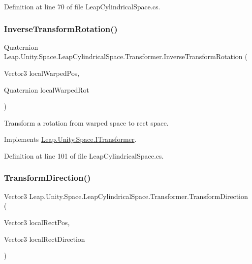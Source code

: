 Definition at line 70 of file Leap\+Cylindrical\+Space.\+cs.

\mbox{\label{class_leap_1_1_unity_1_1_space_1_1_leap_cylindrical_space_1_1_transformer_a679c3020469b4b124056bd8f83c99c26}} 
\subsubsection{\texorpdfstring{InverseTransformRotation()}{InverseTransformRotation()}}
{\footnotesize\ttfamily Quaternion Leap.\+Unity.\+Space.\+Leap\+Cylindrical\+Space.\+Transformer.\+Inverse\+Transform\+Rotation (\begin{DoxyParamCaption}\item[{Vector3}]{local\+Warped\+Pos,  }\item[{Quaternion}]{local\+Warped\+Rot }\end{DoxyParamCaption})}



Transform a rotation from warped space to rect space. 



Implements \mbox{\hyperlink{interface_leap_1_1_unity_1_1_space_1_1_i_transformer_abfcf877e117b7f70b2ce60259b88c459}{Leap.\+Unity.\+Space.\+I\+Transformer}}.



Definition at line 101 of file Leap\+Cylindrical\+Space.\+cs.

\mbox{\label{class_leap_1_1_unity_1_1_space_1_1_leap_cylindrical_space_1_1_transformer_a9ee37b1079bb46d1f4ae1e87cb3491f2}} 
\subsubsection{\texorpdfstring{TransformDirection()}{TransformDirection()}}
{\footnotesize\ttfamily Vector3 Leap.\+Unity.\+Space.\+Leap\+Cylindrical\+Space.\+Transformer.\+Transform\+Direction (\begin{DoxyParamCaption}\item[{Vector3}]{local\+Rect\+Pos,  }\item[{Vector3}]{local\+Rect\+Direction }\end{DoxyParamCaption})}




